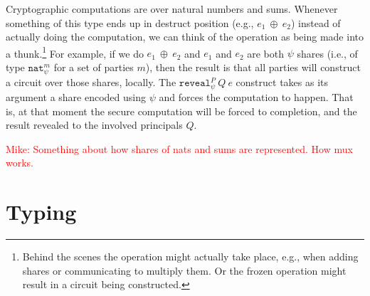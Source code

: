 \documentclass[10pt]{article}
\newcommand{\kw}[1]{\ensuremath{\mathtt{#1}}}
\newcommand{\tnat}{\ensuremath{\mathtt{nat}}}
\newcommand{\ebinop}[2]{\ensuremath{{#1}~\oplus~{#2}}}
\newcommand{\ereveal}[4]{\ensuremath{\kw{reveal}^{#1}_{#4}~{#2}~{#3}}}
\newcommand{\mwh}[1]{\textcolor{red}{Mike: #1}}
\begin{document}
Cryptographic computations are over natural numbers and sums. Whenever
something of this type ends up in destruct position (e.g.,
$\ebinop{e_1}{e_2}$) instead of actually doing the computation, we can
think of the operation as being made into a thunk.\footnote{Behind the
  scenes the operation might actually take place, e.g., when adding
  shares or communicating to multiply them. Or the frozen operation
  might result in a circuit being constructed.} For example, if we do
$\ebinop{e_1}{e_2}$ and $e_1$ and $e_2$ are both $\psi$ shares (i.e.,
of type $\tnat^m_\psi$ for a set of parties $m$), then the result is
that all parties will construct a circuit over those shares,
locally. The $\ereveal{P}{Q}{e}{\psi}$ construct takes as its argument
a share encoded using $\psi$ and forces the computation to
happen. That is, at that moment the secure computation will be forced
to completion, and the result revealed to the involved principals $Q$.

\mwh{Something about how shares of nats and sums are represented. How
  mux works.}

\section{Typing}
\end{document}
